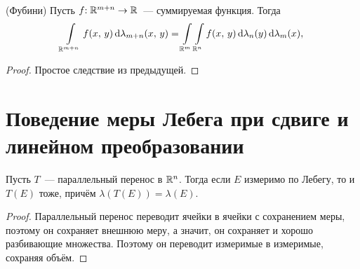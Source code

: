 \documentclass{notes}
\begin{document}
	\begin{thm}(Фубини)
		Пусть $f\text{\text{:}} \; \mathbb{R}^{m + n} \to \mathbb{R}$~--- суммируемая функция. Тогда
		\[
			\int\limits_{\mathbb{R}^{m + n}} f(x, \, y) \, \mathrm{d} \lambda_{m + n}(x, \, y) = \int\limits_{\mathbb{R}^{m}} \int\limits_{\mathbb{R}^n} f(x, \, y) \, \mathrm{d} \lambda_n(y)  \, \mathrm{d} \lambda_{m}(x),
		\]
		\begin{proof}
			Простое следствие из предыдущей.
		\end{proof}
	\end{thm}

\section{Поведение меры Лебега при сдвиге и линейном преобразовании}

	\begin{st}
		Пусть $T$~--- параллельный перенос в $\mathbb{R}^n$. Тогда если $E$ измеримо по Лебегу, то и $T(E)$ тоже, причём $\lambda(T(E)) = \lambda(E)$.
		\begin{proof}
			Параллельный перенос переводит ячейки в ячейки с сохранением меры, поэтому он сохраняет внешнюю меру, а значит, он сохраняет и хорошо разбивающие множества. Поэтому он переводит измеримые в измеримые, сохраняя объём.
		\end{proof}
	\end{st}
\end{document}
